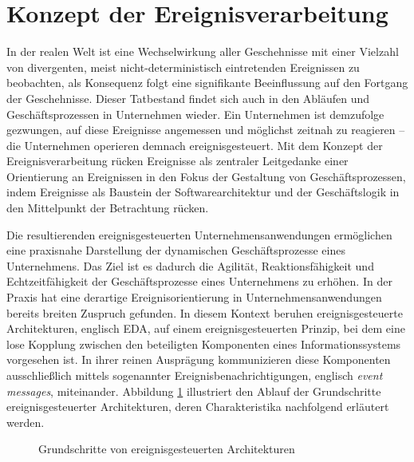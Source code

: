 \section{Konzept der Ereignisverarbeitung}\label{sec:Ereignisverarbeitung}
In der realen Welt ist eine Wechselwirkung aller Geschehnisse mit einer Vielzahl von divergenten, meist nicht-deterministisch eintretenden Ereignissen zu beobachten, als Konsequenz folgt eine signifikante Beeinflussung auf den Fortgang der Geschehnisse.
\cite{Grauer.2010}
Dieser Tatbestand findet sich auch in den Abläufen und Geschäftsprozessen in Unternehmen wieder.
Ein Unternehmen ist demzufolge gezwungen, auf diese Ereignisse angemessen und möglichst zeitnah zu reagieren – die Unternehmen operieren demnach ereignisgesteuert. 
\cite{Schaaf.2015}
Mit dem Konzept der Ereignisverarbeitung rücken Ereignisse als zentraler Leitgedanke einer Orientierung an Ereignissen in den Fokus der Gestaltung von Geschäftsprozessen, indem Ereignisse als Baustein der Softwarearchitektur und der Geschäftslogik in den Mittelpunkt der Betrachtung rücken. 
\cite{Bruns.2010}

Die resultierenden ereignisgesteuerten Unternehmensanwendungen ermöglichen eine praxisnahe Darstellung der dynamischen Geschäftsprozesse eines Unternehmens. 
Das Ziel ist es dadurch die Agilität, Reaktionsfähigkeit und Echtzeitfähigkeit der Geschäftsprozesse eines Unternehmens zu erhöhen. 
In der Praxis hat eine derartige Ereignisorientierung in Unternehmensanwendungen bereits breiten Zuspruch gefunden. 
\cite{Bruns.2015}
In diesem Kontext beruhen ereignisgesteuerte Architekturen, englisch \ac{EDA}, auf einem ereignisgesteuerten Prinzip, bei dem eine lose Kopplung zwischen den beteiligten Komponenten eines Informationssystems vorgesehen ist.  
In ihrer reinen Ausprägung kommunizieren diese Komponenten ausschließlich mittels sogenannter Ereignisbenachrichtigungen, englisch \textit{event messages}, miteinander.
Abbildung \ref{fig:Grundschritte von ereignisgesteuerten Architekturen} illustriert den Ablauf der Grundschritte ereignisgesteuerter Architekturen, deren Charakteristika nachfolgend erläutert werden.
\cite{Schaaf.2015}

\begin{figure}[H]
	\centering 
    \caption[Grundschritte von ereignisgesteuerten Architekturen]
    {Grundschritte von ereignisgesteuerten Architekturen \protect\footnotemark}
    \label{fig:Grundschritte von ereignisgesteuerten Architekturen}
\end{figure}

